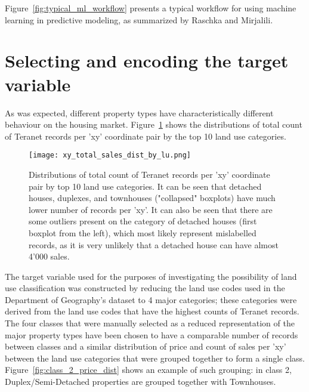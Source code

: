 Figure~\ref{fig:typical_ml_workflow} presents a typical workflow for using machine learning in predictive modeling, as summarized by Raschka and Mirjalili\cite{RaschkaMirjalili2017}.

\section{Selecting and encoding the target variable} \label{sec:select_encode_target}

As was expected, different property types have characteristically different behaviour on the housing market.
Figure~\ref{fig:xy_total_sales_dist_by_lu} shows the distributions of total count of Teranet records per 'xy' coordinate pair by the top 10 land use categories.
\begin{figure}[hbt!]
    \centering
    \texttt{[image: xy\_total\_sales\_dist\_by\_lu.png]}
    \caption{Distributions of total count of Teranet records per 'xy' coordinate pair by top 10 land use categories.
    It can be seen that detached houses, duplexes, and townhouses ("collapsed" boxplots) have much lower number of records per 'xy'.
    It can also be seen that there are some outliers present on the category of detached houses (first boxplot from the left), which most likely represent mislabelled records, as it is very unlikely that a detached house can have almost 4'000 sales.}
    \label{fig:xy_total_sales_dist_by_lu}
\end{figure}

The target variable used for the purposes of investigating the possibility of land use classification was constructed by reducing the land use codes used in the Department of Geography's dataset to 4 major categories;
these categories were derived from the land use codes that have the highest counts of Teranet records.
The four classes that were manually selected as a reduced representation of the major property types have been chosen to have a comparable number of records between classes and a similar distribution of price and count of sales per 'xy' between the land use categories that were grouped together to form a single class.
Figure~\ref{fig:class_2_price_dist} shows an example of such grouping: in class 2, Duplex/Semi-Detached properties are grouped together with Townhouses.

